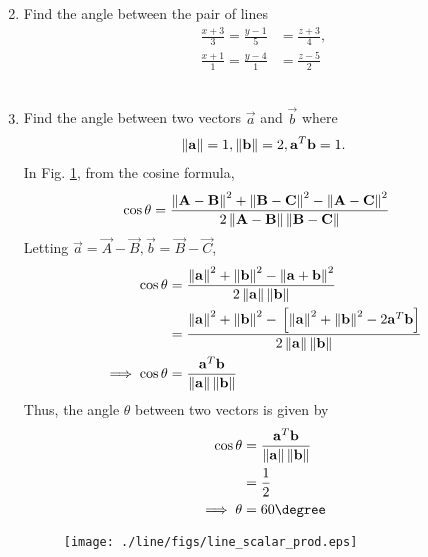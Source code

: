 \documentclass[journal,12pt,twocolumn]{IEEEtran}
\renewcommand\thesection{\arabic{section}}
\begin{document}
\begin{enumerate}[label=\thesection.\arabic*.,ref=\thesection.\theenumi]
\begin{align}
\end{align}
%
\\
\solution 

\item Find the angle between the pair of lines
\begin{align}
\frac{x+3}{3} = \frac{y-1}{5} &= \frac{z+3}{4}, 
\\
\frac{x+1}{1} = \frac{y-4}{1} &= \frac{z-5}{2} 
\end{align}
%
\\
\solution 

%
\item Find the angle between two vectors $\vec{a}$ and $\vec{b}$ where 
%
\begin{align}
\left\lVert\mathbf{a}\right\rVert = 1,
\left\lVert\mathbf{b}\right\rVert = 2,
\mathbf{a}^T\mathbf{b} = 1.
\end{align}
%
\solution In Fig. \ref{fig:line_scalar_prod}, from the cosine formula, 
%
\begin{align}
\cos \theta &= \frac{\left\lVert\mathbf{A}-\mathbf{B}\right\rVert^2+\left\lVert\mathbf{B}-\mathbf{C}\right\rVert^2-\left\lVert\mathbf{A}-\mathbf{C}\right\rVert^2}{2\left\lVert\mathbf{A}-\mathbf{B}\right\rVert\left\lVert\mathbf{B}-\mathbf{C}\right\rVert}
\end{align}
Letting $\vec{a} = \vec{A}-\vec{B}, \vec{b} = \vec{B}-\vec{C}$, 
\begin{align}
\cos \theta &= \frac{\left\lVert\mathbf{a}\right\rVert^2+\left\lVert\mathbf{b}\right\rVert^2-\left\lVert\mathbf{a}+\mathbf{b}\right\rVert^2}{2\left\lVert\mathbf{a}\right\rVert\left\lVert\mathbf{b}\right\rVert}
\\
&= \frac{\left\lVert\mathbf{a}\right\rVert^2+\left\lVert\mathbf{b}\right\rVert^2-{}\left[\left\lVert\mathbf{a}\right\rVert^2+\left\lVert\mathbf{b}\right\rVert^2-2\mathbf{a}^T\mathbf{b}\right]}{2\left\lVert\mathbf{a}\right\rVert\left\lVert\mathbf{b}\right\rVert}
\\
\implies \cos \theta &=\frac{\mathbf{a}^T\mathbf{b}}{\left\lVert\mathbf{a}\right\rVert\left\lVert\mathbf{b}\right\rVert}
\end{align}
%
Thus, the angle $\theta$ between two vectors is given by 
%
\begin{align}
\label{eq:line_scalar_prod}
\cos \theta &= \frac{\vec{a}^T\vec{b}}{\norm{\vec{a}}\norm{\vec{b}}}
\\
&=\frac{1}{2}
\\
\implies \theta &= 60\degree
\end{align}
%
\begin{figure}[!ht]
\texttt{[image: ./line/figs/line\_scalar\_prod.eps]}
\caption{}
\label{fig:line_scalar_prod}
\end{figure}
%



\end{enumerate}
\end{document}
